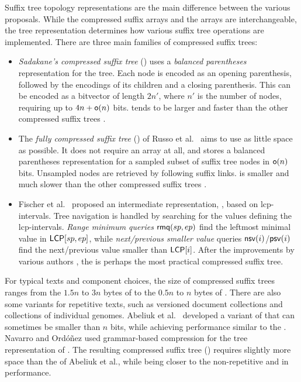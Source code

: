 Suffix tree topology representations are the main difference between the
various \CST{} proposals. While the compressed suffix arrays and the \LCP{} arrays
are interchangeable, the tree representation determines how various suffix tree
operations are implemented. There are three main families of compressed suffix
trees:
\begin{itemize}
\item \emph{Sadakane's compressed suffix tree} (\CSTsada) \cite{Sadakane2007}
uses a \emph{balanced parentheses} representation for the tree. Each node is
encoded as an opening parenthesis, followed by the encodings of its children
and a closing parenthesis. This can be encoded as a bitvector of length $2n'$,
where $n'$ is the number of nodes, requiring up to $4n+\mathsf{o}(n)$ bits.
\CSTsada{} tends to be larger and faster than the other compressed suffix
trees \cite{Gog2011a,Abeliuk2013}.
\item The \emph{fully compressed suffix tree} (\FCST) of Russo et
al.~\cite{Russo2011,Navarro2014a} aims to use as little space as possible. It
does not require an \LCP{} array at all, and stores a balanced parentheses
representation for a sampled subset of suffix tree nodes in $\mathsf{o}(n)$ bits.
Unsampled nodes are retrieved by following suffix links. \FCST{} is smaller
and much slower than the other compressed suffix trees
\cite{Russo2011,Abeliuk2013}.
\item Fischer et al.~\cite{Fischer2009a} proposed an intermediate
representation, \CSTnpr, based on lcp-intervals. Tree navigation is handled
by searching for the values defining the lcp-intervals. \emph{Range minimum
queries} $\mathsf{rmq}(sp,ep)$ find the leftmost minimal value in $\mathsf{LCP}[sp,ep]$,
while \emph{next/previous smaller value} queries $\mathsf{nsv}(i)$/$\mathsf{psv}(i)$ find
the next/previous \LCP{} value smaller than $\mathsf{LCP}[i]$. After the improvements
by various authors \cite{Ohlebusch2009,Fis10,Ohlebusch2010,Gog2011a,Abeliuk2013},
the \CSTnpr{} is perhaps the most practical compressed suffix tree.
\end{itemize}

For typical texts and component choices, the size of compressed suffix trees
ranges from the $1.5n$ to $3n$ bytes of \CSTsada{} to the $0.5n$ to $n$ bytes
of \FCST{} \cite{Gog2011a,Abeliuk2013}. There are also some \CST{} variants
for repetitive texts, such as versioned document collections and collections
of individual genomes. Abeliuk et al.~\cite{Abeliuk2013} developed a variant
of \CSTnpr{} that can sometimes be smaller than $n$ bits, while achieving
performance similar to the \FCST. Navarro and Ordóñez \cite{Navarro2015} used
grammar-based compression for the tree representation of \CSTsada. The
resulting compressed suffix tree (\GCT) requires slightly more space than the
\CSTnpr{} of Abeliuk et al., while being closer to the non-repetitive
\CSTsada{} and \CSTnpr{} in performance.

